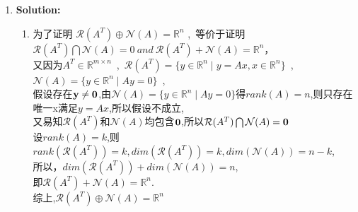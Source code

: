 \documentclass[english,onecolumn,UTF8]{IEEEtran}
\begin{document}
\begin{enumerate}
	
	\item \textbf{Solution:}
	\begin{enumerate}
	
\item 为了证明 $\mathcal{R}(A^T)\oplus \mathcal{N}(A)=\mathbb{R}^n$ ,\ 等价于证明 $\mathcal{R}(A^T) \bigcap \mathcal{N}(A)=0\ and\  \mathcal{R}(A^T)+ \mathcal{N}(A)=\mathbb{R}^n$，
\\又因为$A^T\in \mathbb{R}^{m\times n}$\ ,\ $\mathcal{R}(A^T)=\{ y\in \mathbb{R}^n  \mid y =Ax,x\in \mathbb{R}^n\}$\ ,\ $\mathcal{N}(A)=\{y\in \mathbb{R}^n\mid Ay=0\} $\ ,
\\假设存在$\bold y\not= \bold 0$,由$\mathcal{N}(A)=\{y\in \mathbb{R}^n\mid Ay=0\}$得$rank(A)=n$,则只存在唯一x满足$y=Ax$,所以假设不成立,
\\又易知$\mathcal{R}(A^T)$和$\mathcal{N}(A)$均包含$\bold 0$,所以$\mathcal{R}(A^T) \bigcap \mathcal{N}(A)=\bold 0$
\\设$rank(A)=k$,则$rank(\mathcal{R}(A^T))=k,dim(\mathcal{R}(A^T))=k,dim(\mathcal{N}(A))=n-k$,
\\所以，$dim(\mathcal{R}(A^T))+dim(\mathcal{N}(A))=n$,
\\即$\mathcal{R}(A^T)+ \mathcal{N}(A)=\mathbb{R}^n$.
\\综上,$\mathcal{R}(A^T)\oplus \mathcal{N}(A)=\mathbb{R}^n$



\end{enumerate}
\end{enumerate}
\end{document}
